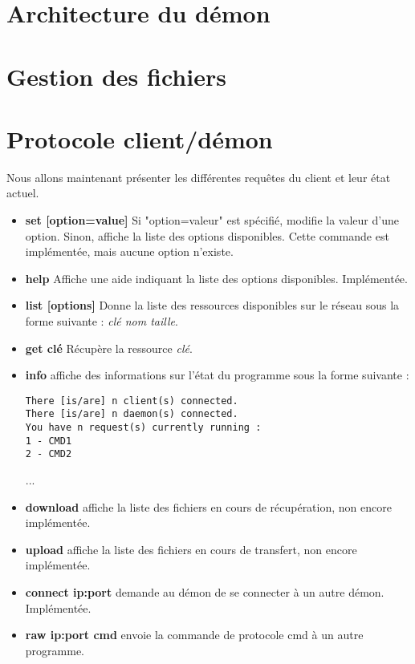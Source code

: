 	\section{Architecture du démon}
	
	\section{Gestion des fichiers}
	
    \section{Protocole client/démon}\label{protclient}
    Nous allons maintenant présenter les différentes requêtes du client et leur état actuel.

\begin{itemize}
\item{\textbf{set [option=value]}} Si "option=valeur" est spécifié, modifie la valeur
d'une option. Sinon, affiche la liste des options disponibles. Cette commande
est implémentée, mais aucune option n'existe.

\item{\textbf{help}} Affiche une aide indiquant la liste des options
disponibles. Implémentée.

\item{\textbf{list [options]}} Donne la liste des ressources disponibles sur
le réseau sous la forme suivante : \textit{clé nom taille}.

\item{\textbf{get clé}} Récupère la ressource \textit{clé}.

\item{\textbf{info}} affiche des informations sur l'état du programme sous la
forme suivante :
\begin{verbatim}
There [is/are] n client(s) connected.
There [is/are] n daemon(s) connected.
You have n request(s) currently running :
1 - CMD1
2 - CMD2
\end{verbatim}
...

\item{\textbf{download}} affiche la liste des fichiers en cours de récupération, non encore implémentée.

\item{\textbf{upload}} affiche la liste des fichiers en cours de transfert, non encore implémentée.

\item{\textbf{connect ip:port}} demande au démon de se connecter à un autre
démon. Implémentée.

\item{\textbf{raw ip:port cmd}} envoie la commande de protocole cmd à un autre programme.

\end{itemize} 
	
